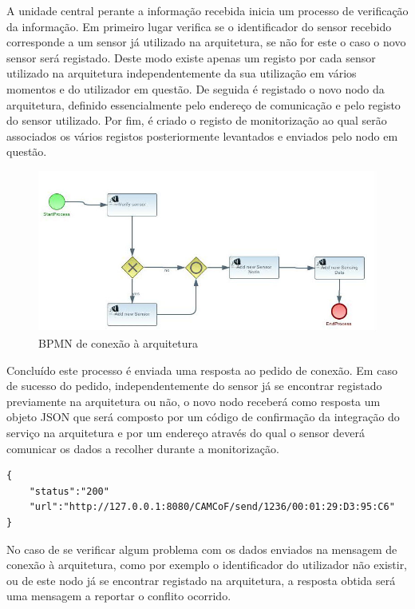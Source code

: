 A unidade central perante a informação recebida inicia um processo de verificação da informação. Em primeiro lugar verifica se o identificador do sensor recebido corresponde a um sensor já utilizado na arquitetura, se não for este o caso o novo sensor será registado. Deste modo existe apenas um registo por cada sensor utilizado na arquitetura independentemente da sua utilização em vários momentos e do utilizador em questão. De seguida é registado o novo nodo da arquitetura, definido essencialmente pelo endereço de comunicação e pelo registo do sensor utilizado. Por fim, é criado o registo de monitorização ao qual serão associados os vários registos posteriormente levantados e enviados pelo nodo em questão.

\begin{figure}[htb]
   \centering
   \includegraphics[scale=0.55]{Images/SaveSensingComponent.jpg}
   \caption{BPMN de conexão à arquitetura}
\end{figure}

Concluído este processo é enviada uma resposta ao pedido de conexão. Em caso de sucesso do pedido, independentemente do sensor já se encontrar registado previamente na arquitetura ou não, o novo nodo receberá como resposta um objeto JSON que será composto por um código de confirmação da integração do serviço na arquitetura e por um endereço através do qual o sensor deverá comunicar os dados a recolher durante a monitorização.\\

\begin{lstlisting}[caption=Mensagem de sucesso em JSON]
{
	"status":"200"
	"url":"http://127.0.0.1:8080/CAMCoF/send/1236/00:01:29:D3:95:C6"
}
\end{lstlisting}

No caso de se verificar algum problema com os dados enviados na mensagem de conexão à arquitetura, como por exemplo o identificador do utilizador não existir, ou de este nodo já se encontrar registado na arquitetura, a resposta obtida será uma mensagem a reportar o conflito ocorrido.\\

